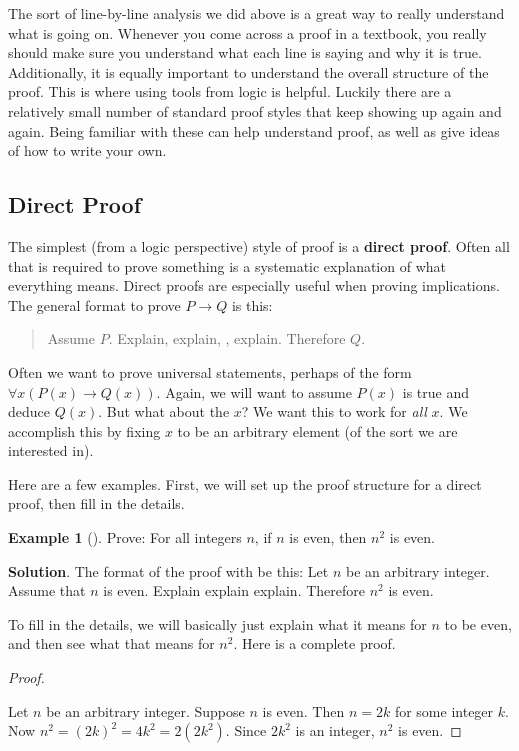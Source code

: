 \documentclass[10pt,]{book}
\newcommand{\terminology}[1]{\textbf{#1}}
\theoremstyle{plain}
\theoremstyle{definition}
\theoremstyle{definition}
\newtheorem{example}[theorem]{Example}
\theoremstyle{definition}
\theoremstyle{definition}
\numberwithin{equation}{chapter}
\def\imp{\rightarrow}
\begin{document}
\par
\hypertarget{p-1931}{}%
The sort of line-by-line analysis we did above is a great way to really understand what is going on. Whenever you come across a proof in a textbook, you really should make sure you understand what each line is saying and why it is true. Additionally, it is equally important to understand the overall structure of the proof. This is where using tools from logic is helpful. Luckily there are a relatively small number of standard proof styles that keep showing up again and again. Being familiar with these can help understand proof, as well as give ideas of how to write your own.%
\typeout{************************************************}
\typeout{************************************************}
\subsection[{Direct Proof}]{Direct Proof}\label{subsection-39}
\hypertarget{p-1932}{}%
%
\par
\hypertarget{p-1933}{}%
The simplest (from a logic perspective) style of proof is a \terminology{direct proof}. Often all that is required to prove something is a systematic explanation of what everything means. Direct proofs are especially useful when proving implications. The general format to prove \(P \imp Q\) is this:%
\begin{quote}\hypertarget{blockquote-14}{}
\hypertarget{p-1934}{}%
Assume \(P\). Explain, explain, \textellipsis{}, explain. Therefore \(Q\).%
\end{quote}
\hypertarget{p-1935}{}%
Often we want to prove universal statements, perhaps of the form \(\forall x (P(x) \imp Q(x))\). Again, we will want to assume \(P(x)\) is true and deduce \(Q(x)\). But what about the \(x\)? We want this to work for \emph{all} \(x\). We accomplish this by fixing \(x\) to be an arbitrary element (of the sort we are interested in).%
\par
\hypertarget{p-1936}{}%
Here are a few examples. First, we will set up the proof structure for a direct proof, then fill in the details.%
\begin{example}[]\label{example-64}
\hypertarget{p-1937}{}%
Prove: For all integers \(n\), if \(n\) is even, then \(n^2\) is even.%
\par\smallskip%
\noindent\textbf{Solution}.\hypertarget{solution-179}{}\quad%
\hypertarget{p-1938}{}%
The format of the proof with be this: Let \(n\) be an arbitrary integer. Assume that \(n\) is even. Explain explain explain. Therefore \(n^2\) is even.%
\par
\hypertarget{p-1939}{}%
To fill in the details, we will basically just explain what it means for \(n\) to be even, and then see what that means for \(n^2\). Here is a complete proof.%
\begin{proof}\hypertarget{proof-21}{}
\hypertarget{p-1940}{}%
Let \(n\) be an arbitrary integer. Suppose \(n\) is even. Then \(n = 2k\) for some integer \(k\). Now \(n^2 = (2k)^2 = 4k^2 = 2(2k^2)\). Since \(2k^2\) is an integer, \(n^2\) is even.%
\end{proof}
\end{example}
\end{document}
